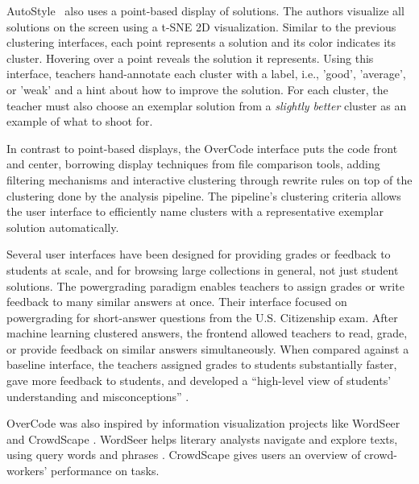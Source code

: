 AutoStyle~\cite{choudhury2016autostyle} also uses a point-based display of solutions. The authors visualize all solutions on the screen using a t-SNE 2D visualization. Similar to the previous clustering interfaces, each point represents a solution and its color indicates its cluster. Hovering over a point reveals the solution it represents. Using this interface, teachers hand-annotate each cluster with a label, i.e., 'good', 'average', or 'weak' and a hint about how to improve the solution. For each cluster, the teacher must also choose an exemplar solution from a {\it slightly better} cluster as an example of what to shoot for.

In contrast to point-based displays, the OverCode interface puts the code front and center, borrowing display techniques from file comparison tools, adding filtering mechanisms and interactive clustering through rewrite rules on top of the clustering done by the analysis pipeline. The pipeline's clustering criteria allows the user interface to efficiently name clusters with a representative exemplar solution automatically.

Several user interfaces have been designed for providing grades or feedback to students at scale, and for browsing large collections in general, not just student solutions. The powergrading paradigm \cite{basupowergrading} enables teachers to assign grades or write feedback to many similar answers at once. Their interface focused on powergrading for short-answer questions from the U.S. Citizenship exam. After machine learning clustered answers, the frontend allowed teachers to read, grade, or provide feedback on similar answers simultaneously. When compared against a baseline interface, the teachers assigned grades to students substantially faster, gave more feedback to students, and developed a ``high-level view of students' understanding and misconceptions'' \cite{basuDivideAndConquer}.

OverCode was also inspired by information visualization projects like WordSeer \cite{wordseerlitcomp13,wordseercikm13} and CrowdScape \cite{crowdscape}. WordSeer helps literary analysts navigate and explore texts, using query words and phrases \cite{wordseerhcir11}. CrowdScape gives users an overview of crowd-workers’ performance on tasks.


